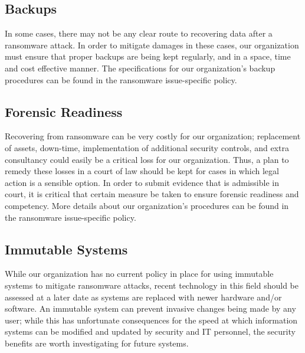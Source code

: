 \documentclass[11pt]{article}
\begin{document}
\subsection{Backups}
\label{sec:org7ae7bf1}
In some cases, there may not be any clear route to recovering data after a ransomware attack. In order to mitigate damages in these cases, our organization must ensure that proper backups are being kept regularly, and in a space, time and cost effective manner. The specifications for our organization's backup procedures can be found in the ransomware issue-specific policy.

\subsection{Forensic Readiness}
\label{sec:org5cd52e2}
Recovering from ransomware can be very costly for our organization; replacement of assets, down-time, implementation of additional security controls, and extra consultancy could easily be a critical loss for our organization. Thus, a plan to remedy these losses in a court of law should be kept for cases in which legal action is a sensible option. In order to submit evidence that is admissible in court, it is critical that certain measure be taken to ensure forensic readiness and competency. More details about our organization's procedures can be found in the ransomware issue-specific policy.

\subsection{Immutable Systems}
\label{sec:orgcba07e4}
While our organization has no current policy in place for using immutable systems to mitigate ransomware attacks, recent technology in this field should be assessed at a later date as systems are replaced with newer hardware and/or software. An immutable system can prevent invasive changes being made by any user; while this has unfortunate consequences for the speed at which information systems can be modified and updated by security and IT personnel, the security benefits are worth investigating for future systems.
\end{document}
